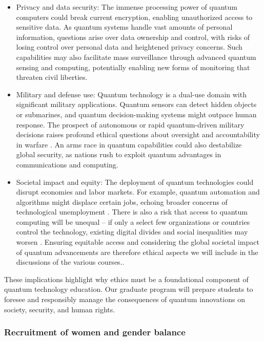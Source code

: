 \documentclass{scrreprt}
\begin{document}
\begin{itemize}
\item Privacy and data security: The immense processing power of quantum computers could break current encryption, enabling unauthorized access to sensitive data. As quantum systems handle vast amounts of personal information, questions arise over data ownership and control, with risks of losing control over personal data and heightened privacy concerns. Such capabilities may also facilitate mass surveillance through advanced quantum sensing and computing, potentially enabling new forms of monitoring that threaten civil liberties.
\item Military and defense use: Quantum technology is a dual-use domain with significant military applications. Quantum sensors can detect hidden objects or submarines, and quantum decision-making systems might outpace human response. The prospect of autonomous or rapid quantum-driven military decisions raises profound ethical questions about oversight and accountability in warfare . An arms race in quantum capabilities could also destabilize global security, as nations rush to exploit quantum advantages in communications and computing.
\item Societal impact and equity: The deployment of quantum technologies could disrupt economies and labor markets. For example, quantum automation and algorithms might displace certain jobs, echoing broader concerns of technological unemployment . There is also a risk that access to quantum computing will be unequal – if only a select few organizations or countries control the technology, existing digital divides and social inequalities may worsen . Ensuring equitable access and considering the global societal impact of quantum advancements are therefore ethical aspects we will include in the discussions of the various courses..
\end{itemize}



These implications highlight why ethics must be a foundational
component of quantum technology education. Our graduate program will
prepare students to foresee and responsibly manage the consequences of
quantum innovations on society, security, and human rights.


\subsubsection{Recruitment of women and gender balance}
\end{document}

